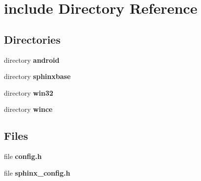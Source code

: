 \section{include Directory Reference}
\label{dir_d44c64559bbebec7f509842c48db8b23}
\subsection*{Directories}
\begin{DoxyCompactItemize}
\item 
directory {\bf android}
\item 
directory {\bf sphinxbase}
\item 
directory {\bf win32}
\item 
directory {\bf wince}
\end{DoxyCompactItemize}
\subsection*{Files}
\begin{DoxyCompactItemize}
\item 
file {\bfseries config.\+h}
\item 
file {\bfseries sphinx\+\_\+config.\+h}
\end{DoxyCompactItemize}
